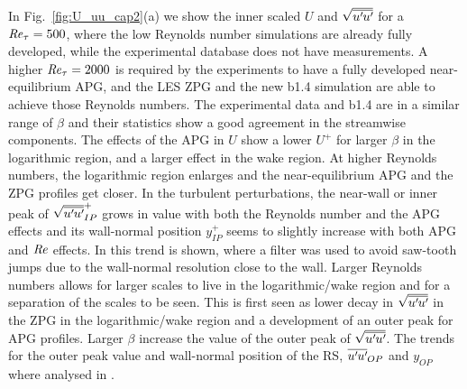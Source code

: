 In Fig.~\ref{fig:U_uu_cap2}(a) we show the inner scaled $U$ and $\sqrt{\overline{u^{\prime}\mkern-1.2mu u^{\prime}\mkern-1.2mu}}$ for a $\mbox{\textit{Re}}_{\tau}=500$, where the low Reynolds number simulations are already fully developed, while the experimental database does not have measurements. A higher $\mbox{\textit{Re}}_{\tau}=2000$ is required by the experiments to have a fully developed near-equilibrium APG, and the LES ZPG and the new b1.4 simulation are able to achieve those Reynolds numbers.
The experimental data \citep{MTL_expSANMIGUEL} and b1.4 are in a similar range of $\beta$ and their statistics show a good agreement in the streamwise components.
The effects of the APG in $U$ show a lower $U^+$ for larger $\beta$ in the logarithmic region, and a larger effect in the wake region. At higher Reynolds numbers, the logarithmic region enlarges and the near-equilibrium APG and the ZPG profiles get closer.
In the turbulent perturbations, the near-wall or inner peak of $\sqrt{\overline{u^{\prime}\mkern-1.2mu u^{\prime}\mkern-1.2mu}}^+_{IP}$ grows in value with both the Reynolds number and the APG effects and its wall-normal position $y_{IP}^+$ seems to slightly increase with both APG and $\mbox{\textit{Re}}$ effects. In \cite{Pozuelo_JFM_22} this trend is shown, where a filter was used to avoid saw-tooth jumps due to the wall-normal resolution close to the wall.
Larger Reynolds numbers allows for larger scales to live in the logarithmic/wake region and for a separation of the scales to be seen. This is first seen as lower decay in $\sqrt{\overline{u^{\prime}\mkern-1.2mu u^{\prime}\mkern-1.2mu}}$ in the ZPG in the logarithmic/wake region and a development of an outer peak for APG profiles. Larger $\beta$ increase the value of the outer peak of $\sqrt{\overline{u^{\prime}\mkern-1.2mu u^{\prime}\mkern-1.2mu}}$. The trends for the outer peak value and wall-normal position of the RS,  $\overline{u^{\prime}\mkern-1.2mu u^{\prime}\mkern-1.2mu}_{OP}$ and $y_{OP}$ where analysed in \cite{Pozuelo_JFM_22}. 



